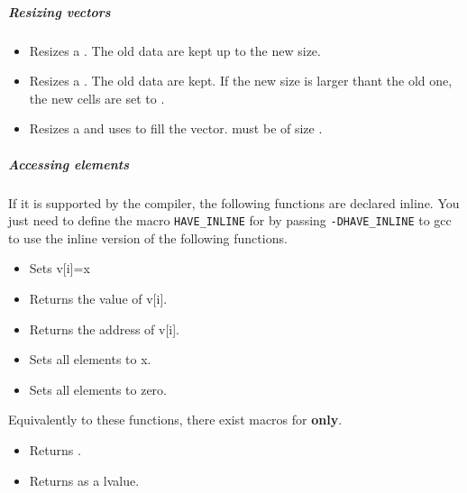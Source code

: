 \subparagraph{Resizing vectors}
\begin{itemize}
\item {}
  \sshortdescribe Resizes a . The old data are kept up to
  the new size.
\item {} 
  \sshortdescribe Resizes a .  The old data are kept. If
  the new size is larger thant the old one, the new cells are set to .
\item {} 
  \sshortdescribe Resizes a  and uses  to fill the
  vector.  must be of size .
\end{itemize}  

\subparagraph{Accessing elements}

If it is supported by the compiler, the following functions are declared inline. You
just need to define the macro \verb!HAVE_INLINE! for by passing
\verb!-DHAVE_INLINE! to gcc to use the inline version of the following
functions.
\begin{itemize}
\item {}
  \sshortdescribe Sets v[i]=x  
\item {}
  \sshortdescribe Returns the value of v[i].  
\item {}
  \sshortdescribe Returns the address of v[i].  
\item {}
  \sshortdescribe Sets all elements to x.  
\item {}
  \sshortdescribe Sets all elements to zero.  
\end{itemize}
Equivalently to these functions, there exist macros for {\bf {} only}.
\begin{itemize}
\item {}
  \sshortdescribe Returns .
  
\item {}
  \sshortdescribe Returns  as a lvalue.
\end{itemize}



